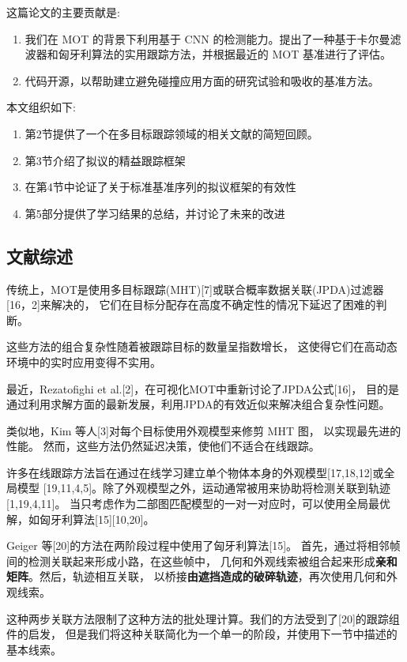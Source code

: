 \documentclass{article}
\begin{document}
这篇论文的主要贡献是:
\begin{enumerate}[label=$\varspadesuit$,nosep]%
    \item 我们在 MOT 的背景下利用基于 CNN 的检测能力。提出了一种基于卡尔曼滤波器和匈牙利算法的实用跟踪方法，并根据最近的 MOT 基准进行了评估。
    \item 代码开源，以帮助建立避免碰撞应用方面的研究试验和吸收的基准方法。
\end{enumerate}
本文组织如下: 
\begin{enumerate}[label=$\varspadesuit$,nosep]%
    \item 第2节提供了一个在多目标跟踪领域的相关文献的简短回顾。
    \item 第3节介绍了拟议的精益跟踪框架
    \item 在第4节中论证了关于标准基准序列的拟议框架的有效性
    \item 第5部分提供了学习结果的总结，并讨论了未来的改进
\end{enumerate}

\subsection{文献综述}
传统上，MOT是使用多目标跟踪(MHT)[7]或联合概率数据关联(JPDA)过滤器[16，2]来解决的，
它们在目标分配存在高度不确定性的情况下延迟了困难的判断。

这些方法的组合复杂性随着被跟踪目标的数量呈指数增长，
这使得它们在高动态环境中的实时应用变得不实用。

最近，Rezatofighi et al.[2]，在可视化MOT中重新讨论了JPDA公式[16]，
目的是通过利用求解方面的最新发展，利用JPDA的有效近似来解决组合复杂性问题。

类似地，Kim 等人[3]对每个目标使用外观模型来修剪 MHT 图，
以实现最先进的性能。
然而，这些方法仍然延迟决策，使他们不适合在线跟踪。

许多在线跟踪方法旨在通过在线学习建立单个物体本身的外观模型[17,18,12]或全局模型
[19,11,4,5]。除了外观模型之外，运动通常被用来协助将检测关联到轨迹[1,19,4,11]。
当只考虑作为二部图匹配模型的一对一对应时，可以使用全局最优解，如匈牙利算法[15][10,20]。

Geiger 等[20]的方法在两阶段过程中使用了匈牙利算法[15]。
首先，通过将相邻帧间的检测关联起来形成小路，在这些帧中，
几何和外观线索被组合起来形成\textbf{亲和矩阵}。然后，轨迹相互关联，
以桥接\textbf{由遮挡造成的破碎轨迹}，再次使用几何和外观线索。

这种两步关联方法限制了这种方法的批处理计算。我们的方法受到了[20]的跟踪组件的启发，
但是我们将这种关联简化为一个单一的阶段，并使用下一节中描述的基本线索。
\end{document}
